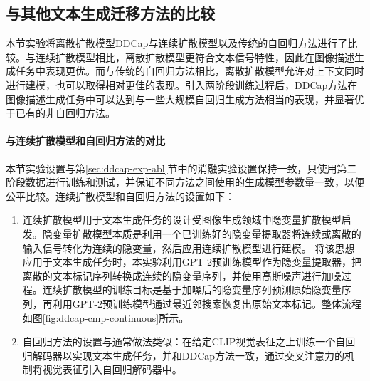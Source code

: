 \subsection{与其他文本生成迁移方法的比较}
本节实验将离散扩散模型DDCap与连续扩散模型以及传统的自回归方法进行了比较。与连续扩散模型相比，离散扩散模型更符合文本信号特性，因此在图像描述生成任务中表现更优。而与传统的自回归方法相比，离散扩散模型允许对上下文同时进行建模，也可以取得相对更佳的表现。引入两阶段训练过程后，DDCap方法在图像描述生成任务中可以达到与一些大规模自回归生成方法相当的表现，并显著优于已有的非自回归方法。

\paragraph{与连续扩散模型和自回归方法的对比} 
本节实验设置与第\ref{sec:ddcap-exp-abl}节中的消融实验设置保持一致，只使用第二阶段数据进行训练和测试，并保证不同方法之间使用的生成模型参数量一致，以便公平比较。连续扩散模型和自回归方法的设置如下：
\begin{enumerate}
    \item 连续扩散模型用于文本生成任务的设计受图像生成领域中隐变量扩散模型\cite{latentdiff}启发。隐变量扩散模型本质是利用一个已训练好的隐变量提取器将连续或离散的输入信号转化为连续的隐变量，然后应用连续扩散模型进行建模。
    将该思想应用于文本生成任务时，本实验利用GPT-2预训练模型作为隐变量提取器，把离散的文本标记序列转换成连续的隐变量序列，并使用高斯噪声进行加噪过程。连续扩散模型的训练目标是基于加噪后的隐变量序列预测原始隐变量序列，再利用GPT-2预训练模型通过最近邻搜索恢复出原始文本标记。整体流程如图\ref{fig:ddcap-cmp-continuous}所示。
    \item 自回归方法的设置与通常做法类似：在给定CLIP视觉表征之上训练一个自回归解码器以实现文本生成任务，并和DDCap方法一致，通过交叉注意力的机制将视觉表征引入自回归解码器中。
\end{enumerate}


